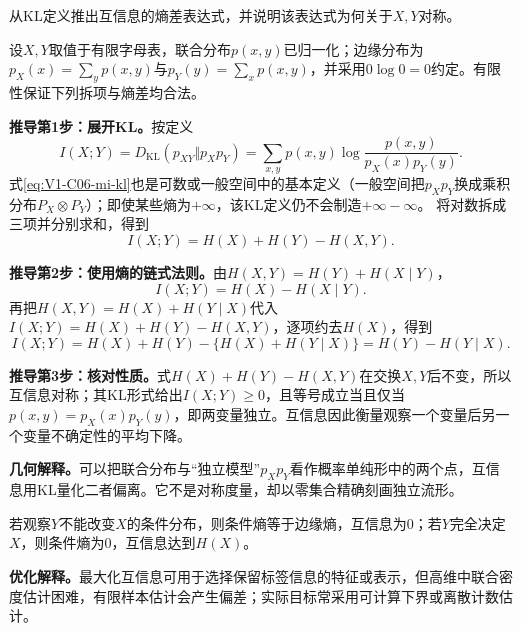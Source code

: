 \begin{derivationgoalbox}
从KL定义推出互信息的熵差表达式，并说明该表达式为何关于$X,Y$对称。
\end{derivationgoalbox}
\begin{derivationprepbox}
设$X,Y$取值于有限字母表，联合分布$p(x,y)$已归一化；边缘分布为$p_X(x)=\sum_y p(x,y)$与$p_Y(y)=\sum_xp(x,y)$，并采用$0\log0=0$约定。有限性保证下列拆项与熵差均合法。
\end{derivationprepbox}
\textbf{推导第1步：展开KL。}按定义
\begin{equation}\label{eq:V1-C06-mi-kl}
I(X;Y)=D_{\mathrm{KL}}(p_{XY}\Vert p_Xp_Y)
=\sum_{x,y}p(x,y)\log\frac{p(x,y)}{p_X(x)p_Y(y)}.
\end{equation}
式\eqref{eq:V1-C06-mi-kl}也是可数或一般空间中的基本定义（一般空间把$p_Xp_Y$换成乘积分布$P_X\otimes P_Y$）；即使某些熵为$+\infty$，该KL定义仍不会制造$+\infty-\infty$。
将对数拆成三项并分别求和，得到
\begin{equation}\label{eq:V1-C06-mi-symmetric}
I(X;Y)=H(X)+H(Y)-H(X,Y).
\end{equation}

\textbf{推导第2步：使用熵的链式法则。}由$H(X,Y)=H(Y)+H(X\mid Y)$，
\begin{equation}\label{eq:V1-C06-mi-entropy-difference}
I(X;Y)=H(X)-H(X\mid Y).
\end{equation}
再把$H(X,Y)=H(X)+H(Y\mid X)$代入$I(X;Y)=H(X)+H(Y)-H(X,Y)$，逐项约去$H(X)$，得到
\[
I(X;Y)=H(X)+H(Y)-\{H(X)+H(Y\mid X)\}=H(Y)-H(Y\mid X).
\]

\textbf{推导第3步：核对性质。}式$H(X)+H(Y)-H(X,Y)$在交换$X,Y$后不变，所以互信息对称；其KL形式给出$I(X;Y)\ge0$，且等号成立当且仅当$p(x,y)=p_X(x)p_Y(y)$，即两变量独立。互信息因此衡量观察一个变量后另一个变量不确定性的平均下降。

\label{struct:V1-C06-CH16}
\begin{geometrybox}
\textbf{几何解释。}可以把联合分布与“独立模型”$p_Xp_Y$看作概率单纯形中的两个点，互信息用KL量化二者偏离。它不是对称度量，却以零集合精确刻画独立流形。
\end{geometrybox}
\label{struct:V1-C06-CH17}
\begin{probabilitybox}
若观察$Y$不能改变$X$的条件分布，则条件熵等于边缘熵，互信息为0；若$Y$完全决定$X$，则条件熵为0，互信息达到$H(X)$。
\end{probabilitybox}
\label{struct:V1-C06-CH18}
\begin{optimizationbox}
\textbf{优化解释。}最大化互信息可用于选择保留标签信息的特征或表示，但高维中联合密度估计困难，有限样本估计会产生偏差；实际目标常采用可计算下界或离散计数估计。
\end{optimizationbox}


